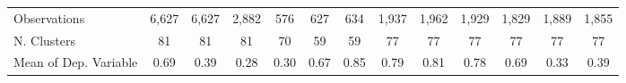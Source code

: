 {\begin{tabular}{l*{12}{c}}
\hline
Observations        &       6,627   &       6,627   &       2,882   &         576   &         627   &         634   &       1,937   &       1,962   &       1,929   &       1,829   &       1,889   &       1,855   \\
N. Clusters         &          81   &          81   &          81   &          70   &          59   &          59   &          77   &          77   &          77   &          77   &          77   &          77   \\
Mean of Dep. Variable&        0.69   &        0.39   &        0.28   &        0.30   &        0.67   &        0.85   &        0.79   &        0.81   &        0.78   &        0.69   &        0.33   &        0.39   \\
\hline\hline
\end{tabular}
}

